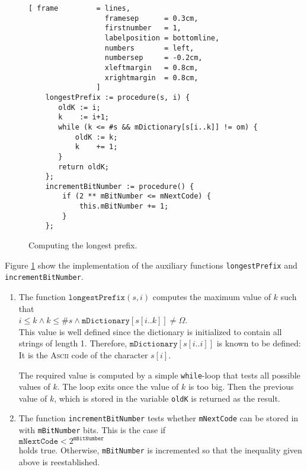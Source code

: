 \begin{figure}[!ht]
\centering
\begin{Verbatim}[ frame         = lines, 
                  framesep      = 0.3cm, 
                  firstnumber   = 1,
                  labelposition = bottomline,
                  numbers       = left,
                  numbersep     = -0.2cm,
                  xleftmargin   = 0.8cm,
                  xrightmargin  = 0.8cm,
                ]
    longestPrefix := procedure(s, i) {
       oldK := i;
       k    := i+1;
       while (k <= #s && mDictionary[s[i..k]] != om) {
           oldK := k;
           k    += 1;
       }
       return oldK;
    };
    incrementBitNumber := procedure() {
        if (2 ** mBitNumber <= mNextCode) {
            this.mBitNumber += 1;
        }
    };
\end{Verbatim}
\vspace*{-0.3cm}
\caption{Computing the longest prefix.}
\label{fig:lzw.stlx-longestPrefix}
\end{figure}
Figure \ref{fig:lzw.stlx-longestPrefix} show the implementation of the auxiliary functions
\texttt{longestPrefix} and \texttt{incrementBitNumber}.  
\begin{enumerate}
\item The function $\texttt{longestPrefix}(s, i)$ computes the maximum value of $k$ such that
      \\[0.2cm]
      \hspace*{1.3cm}
      $i \leq k \wedge k \leq \texttt{\#}s \wedge \mathtt{mDictionary}[s[i..k]] \not= \Omega$.
      \\[0.2cm]
      This value is well defined since the dictionary is initialized to contain all strings of
      length 1.  Therefore, $\texttt{mDictionary}[s[i..i]]$ is known to be defined: It is the
      \textsc{Ascii} code of the character $s[i]$.
      
      The required value is computed by a simple \texttt{while}-loop that tests all possible values of $k$.
      The loop exits once the value of $k$ is too big.  Then the previous value of $k$, which is
      stored in the variable \texttt{oldK} is returned as the result.
\item The function \texttt{incrementBitNumber} tests whether \texttt{mNextCode} can be stored in
      with \texttt{mBitNumber} bits.  This is the case if 
      \\[0.2cm]
      \hspace*{1.3cm}
      $\mathtt{mNextCode} < 2^{\mathtt{mBitNumber}}$
      \\[0.2cm]
      holds true.  Otherwise, \texttt{mBitNumber} is incremented so that the inequality given above
      is reestablished.
\end{enumerate}



